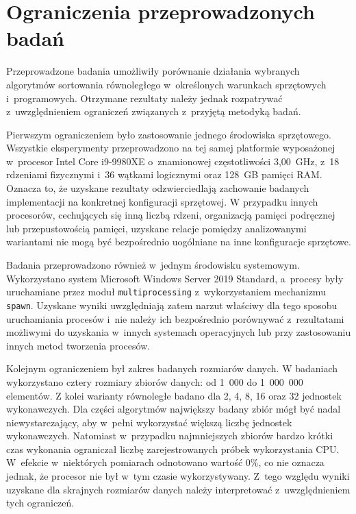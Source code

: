 \section{Ograniczenia przeprowadzonych badań}
\label{sec:OgraniczeniaBadan}

Przeprowadzone badania umożliwiły porównanie działania wybranych algorytmów 
sortowania równoległego w~określonych warunkach sprzętowych i~programowych. 
Otrzymane rezultaty należy jednak rozpatrywać z~uwzględnieniem ograniczeń związanych z~przyjętą metodyką badań.

Pierwszym ograniczeniem było zastosowanie jednego środowiska sprzętowego. 
Wszystkie eksperymenty przeprowadzono na tej samej platformie wyposażonej w~procesor Intel Core i9-9980XE
o~znamionowej częstotliwości 3,00~GHz, z~18 rdzeniami fizycznymi i~36 wątkami logicznymi oraz 128~GB pamięci RAM.
Oznacza to, że uzyskane rezultaty odzwierciedlają zachowanie badanych implementacji na konkretnej konfiguracji sprzętowej. 
W przypadku innych procesorów, cechujących się inną liczbą rdzeni, organizacją pamięci podręcznej lub przepustowością pamięci, 
uzyskane relacje pomiędzy analizowanymi wariantami nie mogą być bezpośrednio uogólniane na inne konfiguracje sprzętowe.

Badania przeprowadzono również w~jednym środowisku systemowym.
Wykorzystano system Microsoft Windows Server 2019 Standard,
a~procesy były uruchamiane przez moduł \texttt{multiprocessing} z~wykorzystaniem mechanizmu \texttt{spawn}.
Uzyskane wyniki uwzględniają zatem narzut właściwy dla tego sposobu uruchamiania procesów i~nie należy ich bezpośrednio porównywać 
z~rezultatami możliwymi do uzyskania w~innych systemach operacyjnych lub przy zastosowaniu innych metod tworzenia procesów.

Kolejnym ograniczeniem był zakres badanych rozmiarów danych.
W badaniach wykorzystano cztery rozmiary zbiorów danych: od 1~000 do 1~000~000 elementów.
Z kolei warianty równoległe badano dla 2, 4, 8, 16 oraz 32 jednostek wykonawczych.
Dla części algorytmów największy badany zbiór mógł być nadal niewystarczający, aby w~pełni wykorzystać większą liczbę jednostek wykonawczych.
Natomiast w~przypadku najmniejszych zbiorów bardzo krótki czas wykonania ograniczał liczbę zarejestrowanych próbek wykorzystania CPU. 
W~efekcie w~niektórych pomiarach odnotowano wartość 0\%, co nie oznacza jednak, że procesor nie był w~tym czasie wykorzystywany.
Z~tego względu wyniki uzyskane dla skrajnych rozmiarów danych należy interpretować z~uwzględnieniem tych ograniczeń.

